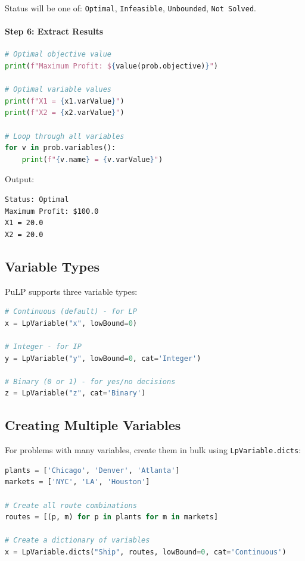 Status will be one of: \texttt{Optimal}, \texttt{Infeasible}, \texttt{Unbounded}, \texttt{Not Solved}.

\paragraph{Step 6: Extract Results}

\begin{lstlisting}[language=Python]
# Optimal objective value
print(f"Maximum Profit: ${value(prob.objective)}")

# Optimal variable values
print(f"X1 = {x1.varValue}")
print(f"X2 = {x2.varValue}")

# Loop through all variables
for v in prob.variables():
    print(f"{v.name} = {v.varValue}")
\end{lstlisting}

Output:
\begin{verbatim}
Status: Optimal
Maximum Profit: $100.0
X1 = 20.0
X2 = 20.0
\end{verbatim}

\subsection{Variable Types}

PuLP supports three variable types:

\begin{lstlisting}[language=Python]
# Continuous (default) - for LP
x = LpVariable("x", lowBound=0)

# Integer - for IP
y = LpVariable("y", lowBound=0, cat='Integer')

# Binary (0 or 1) - for yes/no decisions
z = LpVariable("z", cat='Binary')
\end{lstlisting}

\subsection{Creating Multiple Variables}

For problems with many variables, create them in bulk using \texttt{LpVariable.dicts}:

\begin{lstlisting}[language=Python]
plants = ['Chicago', 'Denver', 'Atlanta']
markets = ['NYC', 'LA', 'Houston']

# Create all route combinations
routes = [(p, m) for p in plants for m in markets]

# Create a dictionary of variables
x = LpVariable.dicts("Ship", routes, lowBound=0, cat='Continuous')
\end{lstlisting}


